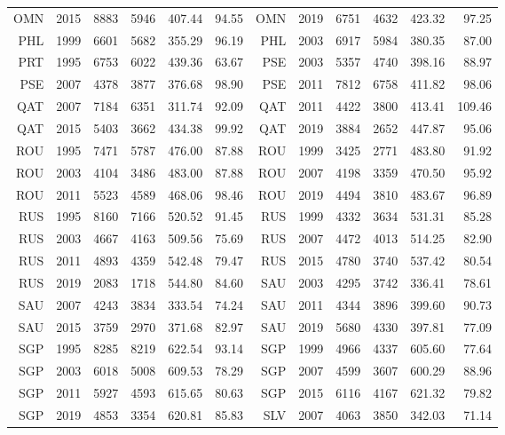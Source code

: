 {\begin{longtable}{r|r|r|r|r|r||r|r|r|r|r|r}
    OMN   & 2015  & 8883  & 5946  & 407.44 & 94.55  & OMN   & 2019  & 6751  & 4632  & 423.32 & 97.25 \\
    PHL   & 1999  & 6601  & 5682  & 355.29 & 96.19  & PHL   & 2003  & 6917  & 5984  & 380.35 & 87.00 \\
    PRT   & 1995  & 6753  & 6022  & 439.36 & 63.67  & PSE   & 2003  & 5357  & 4740  & 398.16 & 88.97 \\
    PSE   & 2007  & 4378  & 3877  & 376.68 & 98.90  & PSE   & 2011  & 7812  & 6758  & 411.82 & 98.06 \\
    QAT   & 2007  & 7184  & 6351  & 311.74 & 92.09  & QAT   & 2011  & 4422  & 3800  & 413.41 & 109.46 \\
    QAT   & 2015  & 5403  & 3662  & 434.38 & 99.92  & QAT   & 2019  & 3884  & 2652  & 447.87 & 95.06 \\
    ROU   & 1995  & 7471  & 5787  & 476.00 & 87.88  & ROU   & 1999  & 3425  & 2771  & 483.80 & 91.92 \\
    ROU   & 2003  & 4104  & 3486  & 483.00 & 87.88  & ROU   & 2007  & 4198  & 3359  & 470.50 & 95.92 \\
    ROU   & 2011  & 5523  & 4589  & 468.06 & 98.46  & ROU   & 2019  & 4494  & 3810  & 483.67 & 96.89 \\
    RUS   & 1995  & 8160  & 7166  & 520.52 & 91.45  & RUS   & 1999  & 4332  & 3634  & 531.31 & 85.28 \\
    RUS   & 2003  & 4667  & 4163  & 509.56 & 75.69  & RUS   & 2007  & 4472  & 4013  & 514.25 & 82.90 \\
    RUS   & 2011  & 4893  & 4359  & 542.48 & 79.47  & RUS   & 2015  & 4780  & 3740  & 537.42 & 80.54 \\
    RUS   & 2019  & 2083  & 1718  & 544.80 & 84.60  & SAU   & 2003  & 4295  & 3742  & 336.41 & 78.61 \\
    SAU   & 2007  & 4243  & 3834  & 333.54 & 74.24  & SAU   & 2011  & 4344  & 3896  & 399.60 & 90.73 \\
    SAU   & 2015  & 3759  & 2970  & 371.68 & 82.97  & SAU   & 2019  & 5680  & 4330  & 397.81 & 77.09 \\
    SGP   & 1995  & 8285  & 8219  & 622.54 & 93.14  & SGP   & 1999  & 4966  & 4337  & 605.60 & 77.64 \\
    SGP   & 2003  & 6018  & 5008  & 609.53 & 78.29  & SGP   & 2007  & 4599  & 3607  & 600.29 & 88.96 \\
    SGP   & 2011  & 5927  & 4593  & 615.65 & 80.63  & SGP   & 2015  & 6116  & 4167  & 621.32 & 79.82 \\
    SGP   & 2019  & 4853  & 3354  & 620.81 & 85.83  & SLV   & 2007  & 4063  & 3850  & 342.03 & 71.14 \\

\end{longtable}}
